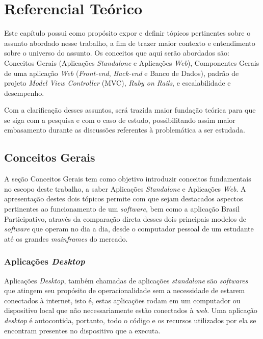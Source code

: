 \chapter{Referencial Teórico}

Este capítulo possui como propósito expor e definir tópicos pertinentes sobre o assunto abordado nesse trabalho, a fim de trazer maior contexto e entendimento sobre o universo do assunto. Os conceitos que aqui serão abordados são: Conceitos Gerais (Aplicações \textit{Standalone} e Aplicações \textit{Web}), Componentes Gerais de uma aplicação \textit{Web} (\textit{Front-end}, \textit{Back-end} e Banco de Dados), padrão de projeto \textit{Model View Controller} (MVC), \textit{Ruby on Rails}, e escalabilidade e desempenho.

Com a clarificação desses assuntos, será trazida maior fundação teórica para que se siga com a pesquisa e com o caso de estudo, possibilitando assim maior embasamento durante as discussões referentes à problemática a ser estudada.

\section{Conceitos Gerais}

A seção Conceitos Gerais tem como objetivo introduzir conceitos fundamentais no escopo deste trabalho, a saber Aplicações \textit{Standalone} e Aplicações \textit{Web}. A apresentação destes dois tópicos permite com que sejam destacados aspectos pertinentes ao funcionamento de um \textit{software}, bem como a aplicação Brasil Participativo, através da comparação direta desses dois principais modelos de \textit{software} que operam no dia a dia, desde o computador pessoal de um estudante até os grandes \textit{mainframes} do mercado.

\subsection{Aplicações \textit{Desktop}}

Aplicações \textit{Desktop}, também chamadas de aplicações \textit{standalone} são \textit{softwares} que atingem seu propósito de operacionalidade sem a necessidade de estarem conectados à internet, isto é, estas aplicações rodam em um computador ou dispositivo local que não necessariamente estão conectados à \textit{web}. Uma aplicação \textit{desktop} é autocontida, portanto, todo o código e os recursos utilizados por ela se encontram presentes no dispositivo que a executa.


